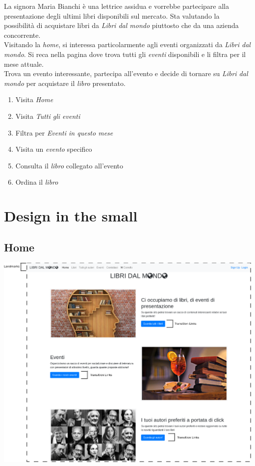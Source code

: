 \documentclass[12pt,a4paper,oneside]{report}
\begin{document}
La signora Maria Bianchi è una lettrice assidua e vorrebbe partecipare alla presentazione degli ultimi libri disponibili sul mercato. Sta valutando la possibilità di acquistare libri da \textit{Libri dal mondo} piuttosto che da una azienda concorrente. \\
Visitando la \textit{home}, si interessa particolarmente agli eventi organizzati da \textit{Libri dal mondo}. Si reca nella pagina dove trova tutti gli \textit{eventi} disponibili e li filtra per il mese attuale. \\
Trova un evento interessante, partecipa all'evento e decide di tornare su \textit{Libri dal mondo} per acquistare il \textit{libro} presentato.

\begin{enumerate}
	\item Visita \textit{Home}
	\item Visita \textit{Tutti gli eventi}
	\item Filtra per \textit{Eventi in questo mese}
	\item Visita un \textit{evento} specifico
	\item Consulta il \textit{libro} collegato all'evento
	\item Ordina il \textit{libro}
\end{enumerate}

\newpage

\chapter{Design in the small}

\section{Home}

\includegraphics[width=1\textwidth]{home}
\end{document}
